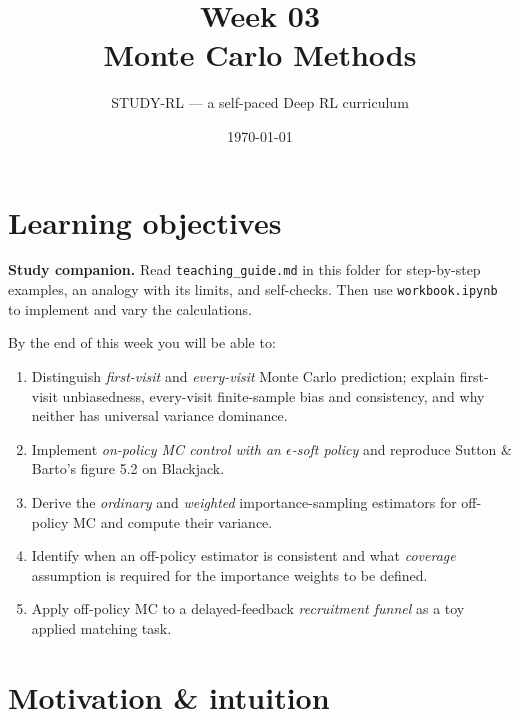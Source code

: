 \documentclass[11pt,oneside]{scrbook}
\title{{\color{rlblue}\textbf{Week 03} \\ \Huge Monte Carlo Methods}}
\author{STUDY-RL --- a self-paced Deep RL curriculum}
\date{\today}
\begin{document}
\maketitle
\tableofcontents
\newpage

\chapter*{Learning objectives}

\noindent\textbf{Study companion.} Read \texttt{teaching\_guide.md} in this
folder for step-by-step examples, an analogy with its limits, and self-checks.
Then use \texttt{workbook.ipynb} to implement and vary the calculations.
\par\medskip

\begin{keyidea}
By the end of this week you will be able to:
\begin{enumerate}\setlength\itemsep{2pt}
  \item Distinguish \emph{first-visit} and \emph{every-visit} Monte Carlo
        prediction; explain first-visit unbiasedness, every-visit finite-sample
        bias and consistency, and why neither has universal variance dominance.
  \item Implement \emph{on-policy MC control with an $\epsilon$-soft policy}
        and reproduce Sutton \& Barto's figure 5.2 on Blackjack.
  \item Derive the \emph{ordinary} and \emph{weighted} importance-sampling
        estimators for off-policy MC and compute their variance.
  \item Identify when an off-policy estimator is consistent and what
        \emph{coverage} assumption is required for the importance weights to
        be defined.
  \item Apply off-policy MC to a delayed-feedback \emph{recruitment funnel} as
        a toy applied matching task.
\end{enumerate}
\end{keyidea}

\chapter{Motivation \& intuition}
\end{document}
